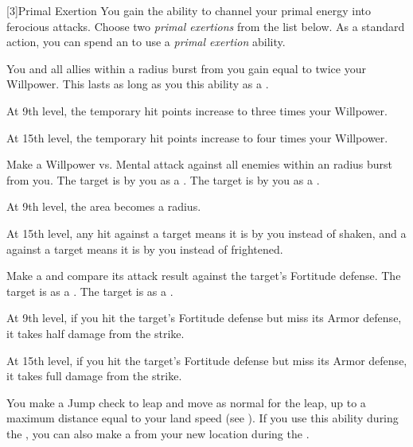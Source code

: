         [3]{Primal Exertion}
        You gain the ability to channel your primal energy into ferocious attacks.
        Choose two \textit{primal exertions} from the list below.
        As a standard action, you can spend an  to use a \textit{primal exertion} ability.
        {
             You and all allies within a \arealarge radius burst from you gain  equal to twice your Willpower.
            This lasts as long as you  this ability as a .

            At 9th level, the temporary hit points increase to three times your Willpower.
            \par At 15th level, the temporary hit points increase to four times your Willpower.

            Make a Willpower vs. Mental attack against all enemies within an \areamed radius burst from you.
             The target is \shaken by you as a .
             The target is \frightened by you as a .

            At 9th level, the area becomes a \areahuge radius.
            \par At 15th level, any hit against a target means it is \frightened by you instead of shaken, and a  against a target means it is \panicked by you instead of frightened.

             Make a  and compare its attack result against the target's Fortitude defense.
             The target is \sickened as a .
             The target is \nauseated as a .

            At 9th level, if you hit the target's Fortitude defense but miss its Armor defense, it takes half damage from the strike.
            \par At 15th level, if you hit the target's Fortitude defense but miss its Armor defense, it takes full damage from the strike.

             You make a Jump check to leap and move as normal for the leap, up to a maximum distance equal to your land speed (see ).
            If you use this ability during the , you can also make a  from your new location during the .

}
